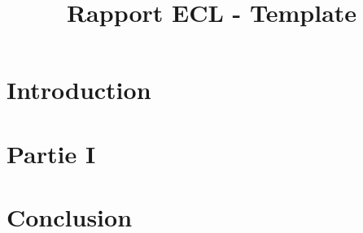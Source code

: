 \documentclass{rapportECL}
\title{Rapport ECL - Template} %
\begin{document}


        
\fairemarges %
\fairepagedegarde %
\tabledematieres %
\pagesignatures{}{}{}{}{}{}{}{}      %



\renewcommand{\thesection}{\Roman{section}}
\renewcommand{\thesubsection}{\arabic{subsection}.}

\newcommand{\sectiontoc}[2][\thepage]{%
  \stepcounter{section}%
  \contentsline{section}{\thesection\hspace{1em}#2}{#1}}
\newcommand{\subsectiontoc}[2][\thepage]{%
  \stepcounter{subsection}%
  \contentsline{subsection}{\thesubsection\hspace{1em}#2}{#1}}



\section*{Introduction} 

\section{Partie I}

\section*{Conclusion}
\end{document}

